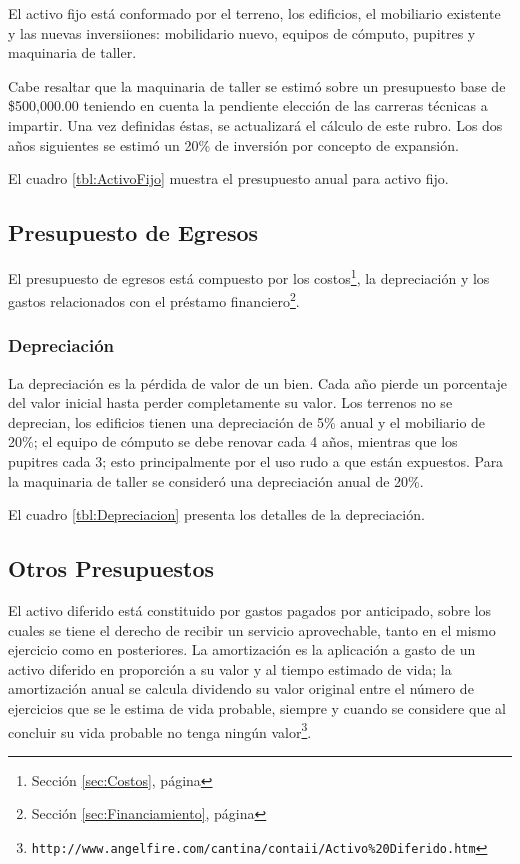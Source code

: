 El activo fijo está conformado por el terreno, los edificios, el mobiliario existente y las nuevas inversiiones: mobilidario nuevo, equipos de cómputo, pupitres y maquinaria de taller.

Cabe resaltar que la maquinaria de taller se estimó sobre un presupuesto base de \$500,000.00 teniendo en cuenta la pendiente elección de las carreras técnicas a impartir. Una vez definidas éstas, se actualizará el cálculo de este rubro. Los dos años siguientes se estimó un 20\% de inversión por concepto de expansión.

El cuadro \ref{tbl:ActivoFijo} muestra el presupuesto anual para activo fijo.



\subsection{Presupuesto de Egresos}

El presupuesto de egresos está compuesto por los costos\footnote{Sección \ref{sec:Costos}, página \pageref{sec:Costos}}, la depreciación y los gastos relacionados con el préstamo financiero\footnote{Sección \ref{sec:Financiamiento}, página \pageref{sec:Financiamiento}}.

\subsubsection{Depreciación}

La depreciación es la pérdida de valor de un bien. Cada año pierde un porcentaje del valor inicial hasta perder completamente su valor. Los terrenos no se deprecian, los edificios tienen una depreciación de 5\% anual y el mobiliario de 20\%; el equipo de cómputo se debe renovar cada 4 años, mientras que los pupitres cada 3; esto principalmente por el uso rudo a que están expuestos. Para la maquinaria de taller se consideró una depreciación anual de 20\%.

El cuadro \ref{tbl:Depreciacion} presenta los detalles de la depreciación.



\subsection{Otros Presupuestos}
\label{sub:Otros:Presupuestos}

El activo diferido está constituido por gastos pagados por anticipado, sobre los cuales se tiene el derecho de recibir un servicio aprovechable, tanto en el mismo ejercicio como en posteriores. La amortización es la aplicación a gasto de un activo diferido en proporción a su valor y al tiempo estimado de vida; la amortización anual se calcula dividendo su valor original entre el número de ejercicios que se le estima de vida probable, siempre y cuando se considere que al concluir su vida probable no tenga ningún valor\footnote{\texttt{http://www.angelfire.com/cantina/contaii/Activo\%20Diferido.htm}}.


